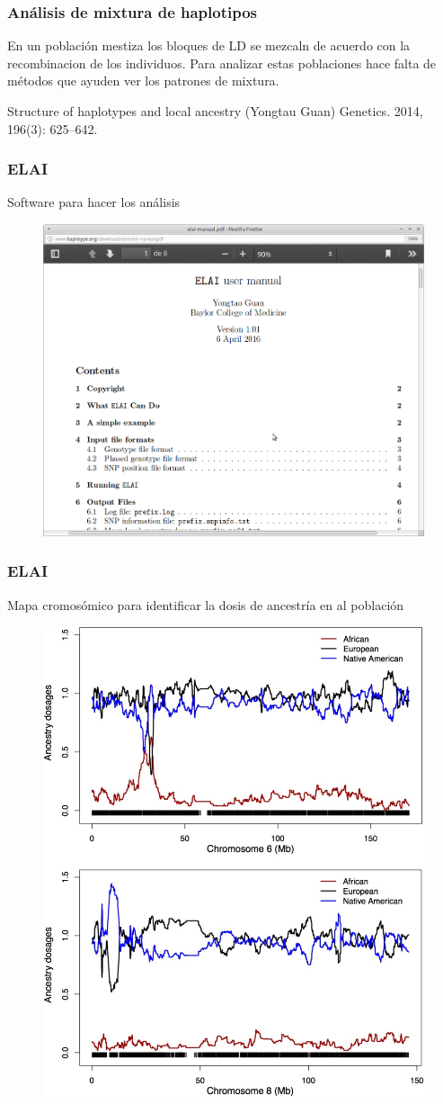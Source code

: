 \documentclass{beamer}\usepackage[]{graphicx}\usepackage[]{color}
\begin{document}
\begin{frame}[fragile]
\frametitle{An\'alisis de mixtura de haplotipos}
En un poblaci\'on mestiza los bloques de LD se mezcaln de acuerdo con la recombinacion de los individuos. Para analizar estas poblaciones hace falta de m\'etodos que ayuden ver los patrones de mixtura.

Structure of haplotypes and local ancestry (Yongtau Guan) Genetics. 2014, 196(3): 625–642. 
\end{frame}


\begin{frame}[fragile]
\frametitle{ELAI}

Software para hacer los an\'alisis 


\begin{figure}[htbp]
\begin{center}
\includegraphics[width=.7\linewidth]{ELAI.png}
\end{center}
\end{figure}

\end{frame}


\begin{frame}[fragile]
\frametitle{ELAI}

Mapa cromos\'omico para identificar la dosis de ancestr\'ia en al poblaci\'on
\begin{figure}[htbp]
\begin{center}
\includegraphics[width=.5\linewidth]{ELAIFig.jpg}
\end{center}
\end{figure}

\end{frame}
\end{document}
